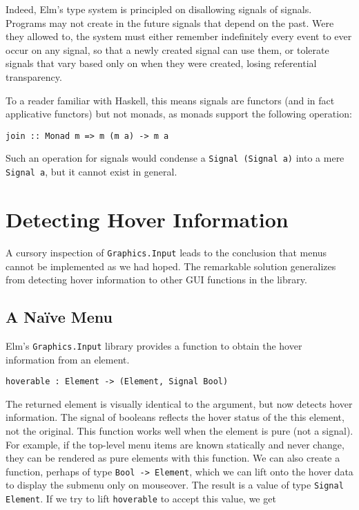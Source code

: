\documentclass{article}
\begin{document}
Indeed, Elm's type system is principled on disallowing signals of signals.
Programs may not create in the future signals that depend on the past. Were they
allowed to, the system must either remember indefinitely every event to ever
occur on any signal, so that a newly created signal can use them, or tolerate
signals that vary based only on when they were created, losing referential
transparency.

To a reader familiar with Haskell, this means signals are functors (and
in fact applicative functors) but not monads, as monads support the
following operation:

\begin{verbatim}
join :: Monad m => m (m a) -> m a
\end{verbatim}

Such an operation for signals would condense a
\texttt{Signal (Signal a)} into a mere \texttt{Signal a}, but it cannot
exist in general.

\section{Detecting Hover Information}\label{detecting-hover-information}
A cursory inspection of \texttt{Graphics.Input} leads to the conclusion that
menus cannot be implemented as we had hoped. The remarkable solution generalizes
from detecting hover information to other GUI functions in the library.

\subsection{A Na\"{i}ve Menu}\label{a-naive-menu}

Elm's \texttt{Graphics.Input} library provides a function to obtain the hover
information from an element.

\texttt{hoverable : Element -> (Element, Signal Bool)}

The returned element is visually identical to the argument, but now detects
hover information. The signal of booleans reflects the hover status of
the this element, not the original. This function works well when the
element is pure (not a signal). For example, if the top-level menu items are
known statically and never change, they can be rendered as pure elements with
this function. We can also create a function, perhaps of type \texttt{Bool ->
Element}, which we can lift onto the hover data to display the submenu only on
mouseover. The result is a value of type \texttt{Signal Element}. If we try to
lift \texttt{hoverable} to accept this value, we get
\end{document}
